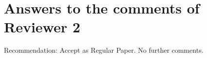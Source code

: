 \section{Answers to the comments of Reviewer 2}
%
%

Recommendation: Accept as Regular Paper. No further comments. 




